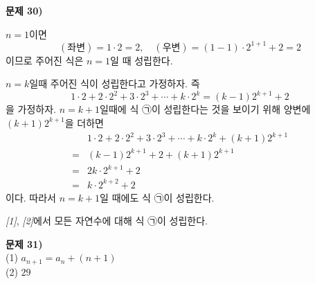 \documentclass{oblivoir}
\newcounter{num}
\newcommand\an[1]{\par\bigskip\noindent\textbf{문제 #1)}\\}
\begin{document}
%
\an{30}
\begin{enumerate}[label=\emph{[\arabic*]}]
\item
\(n=1\)이면
\[(좌변)=1\cdot2=2,\quad (우변)=(1-1)\cdot2^{1+1}+2=2\]
이므로 주어진 식은 \(n=1\)일 때 성립한다.
\item
\(n=k\)일때 주어진 식이 성립한다고 가정하자.
즉
\[1\cdot2+2\cdot2^2+3\cdot2^3+\cdots+k\cdot2^k=(k-1)2^{k+1}+2\]
을 가정하자.
\(n=k+1\)일때에 식 ㉠이 성립한다는 것을 보이기 위해 양변에 \((k+1)2^{k+1}\)을 더하면
\begin{align*}
&1\cdot2+2\cdot2^2+3\cdot2^3+\cdots+k\cdot2^k+(k+1)2^{k+1}\\
=&(k-1)2^{k+1}+2+(k+1)2^{k+1}\\
=&2k\cdot2^{k+1}+2\\
=&k\cdot2^{k+2}+2
\end{align*}
이다.
따라서 \(n=k+1\)일 때에도 식 ㉠이 성립한다.
\end{enumerate}
\emph{[1]}, \emph{[2]}에서 모든 자연수에 대해 식 ㉠이 성립한다.

%
\an{31}
(1) \(a_{n+1}=a_n+(n+1)\)\\
(2) \(29\)
\end{document}

